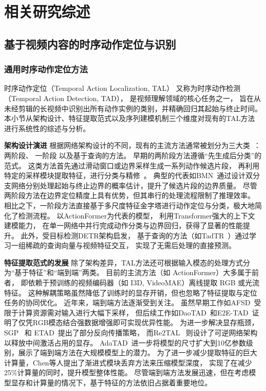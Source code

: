 \chapter{相关研究综述}

\section{基于视频内容的时序动作定位与识别}
\subsection{通用时序动作定位方法}
时序动作定位（Temporal Action Localization, TAL）
又称为时序动作检测（Temporal Action Detection, TAD），
是视频理解领域的核心任务之一，
旨在从未经剪辑的长视频中识别出所有动作实例的类别，并精确回归其起始与终止时间。
本小节从架构设计、特征提取范式以及序列建模机制三个维度对现有的TAL方法进行系统性的综述与分析。

\textbf{架构设计演进}\quad
根据网络架构设计的不同，现有的主流方法通常被划分为三大类~\cite{liu2024end}：
两阶段\cite{chao2018rethinking,lin2019bmn,zeng2019graph,zhao2021video,zhu2021enriching}、
一阶段\cite{zhang2022actionformer, shi2023tridet, yang2024adapting}
以及基于查询\cite{liu2022end}的方法。
早期的两阶段方法遵循“先生成后分类”的范式。
这类方法首先通过滑动窗口或边界采样生成一系列动作候选片段，
再利用特定的采样模块提取特征，进行分类与精修~\cite{chao2018rethinking, lin2019bmn,zhu2021enriching}。
典型的代表如BMN~\cite{lin2019bmn}通过设计双分支网络分别处理起始与终止边界的概率估计，提升了候选片段的边界质量。
尽管两阶段方法在边界定位精度上具有优势，但其串行的处理流程限制了推理效率。
相比之下，一阶段方法直接基于多尺度特征金字塔进行动作定位与分类，极大地简化了检测流程。
以ActionFormer\cite{zhang2022actionformer}为代表的模型，
利用Transformer\cite{vaswani2017attention}强大的上下文建模能力，
在单一网络中并行完成动作分类与边界回归，获得了显著的性能提升。
此外，受目标检测DETR\cite{zhu2020deformable}架构启发，
基于查询的方法（如TadTR~\cite{liu2022end}）通过学习一组稀疏的查询向量与视频特征交互，
实现了无需后处理的直接预测。

\textbf{特征提取范式的发展}\quad
除了架构差异，TAL方法还可根据输入模态的处理方式分为“基于特征”和“端到端”两类。
目前的主流方法（如 ActionFormer\cite{zhang2022actionformer}）大多属于前者，
即依赖于预训练的视频编码器（如 I3D\cite{carreira2017quo}, VideoMAE\cite{tong2022videomae,wang2023videomae}）离线提取 RGB 或光流特征。
这种解耦策略虽然降低了训练时的显存开销，但也忽略了特征提取与定位任务的协同优化。
近年来，端到端方法逐渐受到关注。
虽然早期工作如AFSD~\cite{lin2021learning}受限于计算资源需对输入进行大幅下采样，
但后续工作如DaoTAD~\cite{wang2021rgb}和E2E-TAD~\cite{liu2022empirical}证明了仅凭RGB模态结合强数据增强即可实现优异性能。
为进一步解决显存瓶颈，SGP~\cite{cheng2022stochastic} 和 ETAD~\cite{liu2023etad}提出了部分反向传播策略，
而Re2TAL~\cite{zhao2023re2tal} 则设计了可逆网络架构以释放中间激活占用的显存。
AdaTAD~\cite{liu2024end}进一步将模型的尺寸扩大到10亿参数级别，展示了端到端方法在大规模模型上的潜力。
为了进一步减少提取特征的巨大计算量，Chen等人\cite{chen2025temporal}提出了渐进式模块丢弃方法来压缩模型深度，
实现了在减少25\%计算量的同时，提升模型整体性能。
尽管端到端方法发展迅速，但在考虑模型显存和计算量的情况下，基于特征的方法依旧占据着重要地位。


